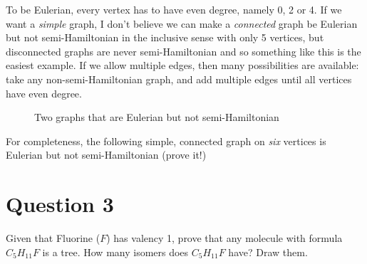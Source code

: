\documentclass{amsart}
\begin{document}
To be Eulerian, every vertex has to have even degree, namely 0, 2 or 4.  If we want a \emph{simple} graph, I don't believe we can make a \emph{connected} graph be Eulerian but not semi-Hamiltonian in the inclusive sense with only 5 vertices, but disconnected graphs are never semi-Hamiltonian and so something like this is the easiest example. 
If we allow multiple edges, then many possibilities are available: take any non-semi-Hamiltonian graph, and add multiple edges until all vertices have even degree.
\begin{figure}

  \caption{Two graphs that are Eulerian but not semi-Hamiltonian}
  \end{figure}

For completeness, the following simple, connected graph on \emph{six} vertices is Eulerian but not semi-Hamiltonian (prove it!)


\section*{Question 3}


Given that Fluorine ($F$) has valency 1, prove that any molecule with formula $C_5H_{11}F$ is a tree.  How many isomers does $C_5H_{11}F$ have?  Draw them.
\end{document}
